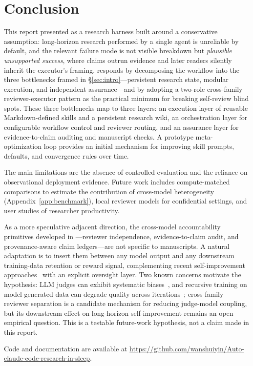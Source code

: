 \section{Conclusion}
\label{sec:conclusion}

This report presented \aris{} as a research harness built around a conservative assumption: long-horizon research performed by a single agent is unreliable by default, and the relevant failure mode is not visible breakdown but \emph{plausible unsupported success}, where claims outrun evidence and later readers silently inherit the executor's framing.
\aris{} responds by decomposing the workflow into the three bottlenecks framed in \S\ref{sec:intro}---persistent research state, modular execution, and independent assurance---and by adopting a two-role cross-family reviewer-executor pattern as the practical minimum for breaking self-review blind spots.
These three bottlenecks map to three layers: an execution layer of reusable Markdown-defined skills and a persistent research wiki, an orchestration layer for configurable workflow control and reviewer routing, and an assurance layer for evidence-to-claim auditing and manuscript checks.
A prototype meta-optimization loop provides an initial mechanism for improving skill prompts, defaults, and convergence rules over time.

The main limitations are the absence of controlled evaluation and the reliance on observational deployment evidence.
Future work includes compute-matched comparisons to estimate the contribution of cross-model heterogeneity (Appendix~\ref{app:benchmark}), local reviewer models for confidential settings, and user studies of researcher productivity.

As a more speculative adjacent direction, the cross-model accountability primitives developed in \aris{}---reviewer independence, evidence-to-claim audit, and provenance-aware claim ledgers---are not specific to manuscripts.
A natural adaptation is to insert them between any model output and any downstream training-data retention or reward signal, complementing recent self-improvement approaches~\citep{bai2022constitutional,lee2024rlaif,yuan2024selfrewarding,yu2025rlaifv} with an explicit oversight layer.
Two known concerns motivate the hypothesis: LLM judges can exhibit systematic biases~\citep{zheng2023judging}, and recursive training on model-generated data can degrade quality across iterations~\citep{shumailov2024curse}; cross-family reviewer separation is a candidate mechanism for reducing judge-model coupling, but its downstream effect on long-horizon self-improvement remains an open empirical question.
This is a testable future-work hypothesis, not a claim made in this report.

\ifPaperAnonymous\else
Code and documentation are available at \url{https://github.com/wanshuiyin/Auto-claude-code-research-in-sleep}.
\fi
